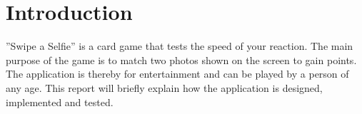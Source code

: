 \section{Introduction}
''Swipe a Selfie'' is a card game that tests the speed of your reaction. The main purpose of the game is to match two photos shown on the screen to gain points. The application is thereby for entertainment and can be played by a person of any age. This report will briefly explain how the application is designed, implemented and tested.
